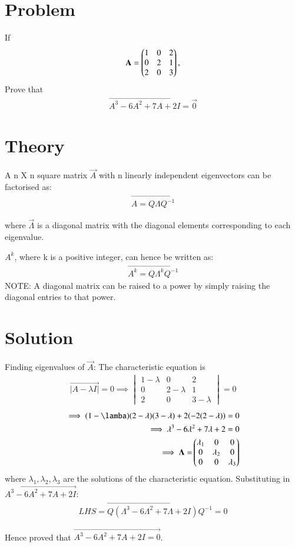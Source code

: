 \documentclass[journal,12pt,twocolumn]{IEEEtran}
\begin{document}
\section{Problem}
If 
\begin{align}
\mathbf{A} = \begin{pmatrix}1 & 0 & 2 \\ 0 & 2 & 1 \\ 2 & 0 & 3\end{pmatrix},
\end{align}
Prove that
\begin{align}
\vec{A^3 - 6A^2 + 7A + 2I} = \vec{0}
\end{align}
\section{Theory}
A n X n square matrix $\vec{A}$ with n linearly independent eigenvectors can be factorised as: 
    \begin{align}
        \vec{A = Q \Lambda Q^{-1}} 
    \end{align}

where $\vec{\Lambda}$ is a diagonal matrix with the diagonal elements corresponding to each eigenvalue. 

$A^k$, where k is a positive integer, can hence be written as:
    \begin{align}
        \vec{A^k = Q \Lambda^k Q^{-1}} 
    \end{align}
NOTE: A diagonal matrix can be raised to a power by simply raising the diagonal entries to that power.


\section{Solution}
Finding eigenvalues of $\vec{A}$:
The characteristic equation is 
\begin{align}
\vec{|A - \lambda I|} = 0   
\implies \begin{vmatrix}1 -\lambda & 0 & 2 \\ 0 & 2 -\lambda & 1 \\ 2 & 0 & 3-\lambda\end{vmatrix} = 0 
\end{align}
\begin{align}
\implies (1-\lamba)(2-\lambda)(3-\lambda) + 2(-2(2-\lambda)) = 0
\\\implies \lambda^3 - 6\lambda^2 + 7\lambda + 2 = 0     
\\ \implies \vec{\Lambda=} \myvec{\lambda_1 & 0 & 0 \\ 0 & \lambda_2 & 0 \\ 0 & 0 & \lambda_3}
\end{align}
where $\lambda_1, \lambda_2, \lambda_3$ are the solutions of the characteristic equation. 
\newline
Substituting in $\vec{A^3 - 6A^2 + 7A + 2I}$:
\begin{align}
    LHS = \vec{ Q (\Lambda^3 - 6\Lambda^2 + 7\Lambda + 2I )  Q^{-1}} = 0
\end{align}

Hence proved that $\vec{A^3 - 6A^2 + 7A + 2I = 0}$.
\end{document}

